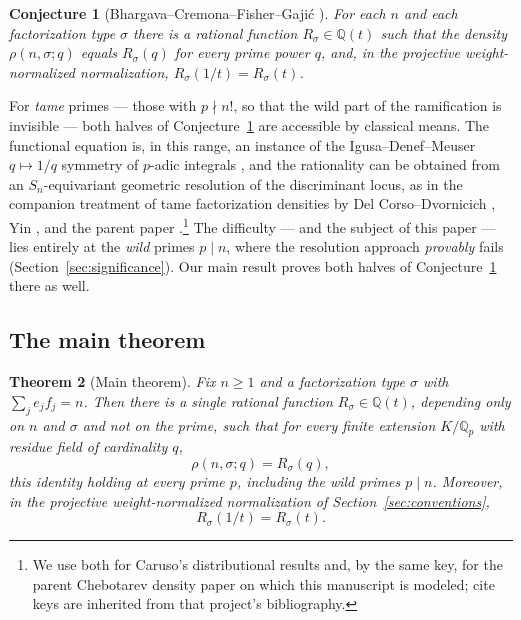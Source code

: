 \documentclass[pdflatex,sn-mathphys-num]{sn-jnl}%
\newcommand{\Qp}{\mathbb{Q}_p}
\newcommand{\bbQ}{\mathbb{Q}}
\theoremstyle{plain}
\newtheorem{theorem}{Theorem}[section]
\newtheorem{conjecture}[theorem]{Conjecture}
\theoremstyle{definition}
\theoremstyle{remark}
\numberwithin{equation}{section}
\begin{document}
\begin{conjecture}[Bhargava--Cremona--Fisher--Gaji\'c {\cite[Conj.~1.2 \emph{et seq.}]{bhargava2022density}}]
\label{conj:bcfg}
For each $n$ and each factorization type $\sigma$ there is a rational function
$R_\sigma\in\bbQ(t)$ such that the density $\rho(n,\sigma;q)$ equals $R_\sigma(q)$
for every prime power $q$, and, in the projective weight-normalized normalization,
$R_\sigma(1/t)=R_\sigma(t)$.
\end{conjecture}

For \emph{tame} primes --- those with $p\nmid n!$, so that the wild part of the
ramification is invisible --- both halves of Conjecture~\ref{conj:bcfg} are
accessible by classical means. The functional equation is, in this range, an
instance of the Igusa--Denef--Meuser $q\mapsto 1/q$ symmetry of $p$-adic
integrals \cite{denef1991functional}, and the rationality can be obtained from an
$S_{n}$-equivariant geometric resolution of the discriminant locus, as in the
companion treatment of tame factorization densities by Del Corso--Dvornicich
\cite{del_corso_dvornicich_2000}, Yin \cite{john}, and the parent paper
\cite{caruso2022zeroes}.\footnote{We use \cite{caruso2022zeroes} both for
Caruso's distributional results and, by the same key, for the parent Chebotarev
density paper on which this manuscript is modeled; cite keys are inherited from
that project's bibliography.} The difficulty --- and the subject of this paper
--- lies entirely at the \emph{wild} primes $p\mid n$, where the resolution
approach \emph{provably} fails (Section~\ref{sec:significance}). Our main result
proves both halves of Conjecture~\ref{conj:bcfg} there as well.

\subsection{The main theorem}\label{sec:main-results}

\begin{theorem}[Main theorem]\label{thm:main}
Fix $n\ge 1$ and a factorization type $\sigma$ with $\sum_{j}e_{j}f_{j}=n$. Then
there is a single rational function $R_{\sigma}\in\bbQ(t)$, depending only on $n$
and $\sigma$ and \emph{not} on the prime, such that for every finite extension
$K/\Qp$ with residue field of cardinality $q$,
\[
  \rho(n,\sigma;q)=R_{\sigma}(q),
\]
this identity holding at \emph{every} prime $p$, including the wild primes
$p\mid n$. Moreover, in the projective weight-normalized normalization of
Section~\ref{sec:conventions},
\[
  R_{\sigma}(1/t)=R_{\sigma}(t).
\]
\end{theorem}
\end{document}
